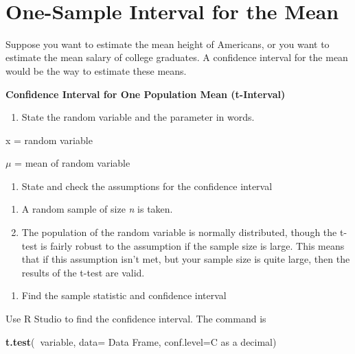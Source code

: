 \documentclass[
]{book}
\newenvironment{Shaded}{\begin{snugshade}}{\end{snugshade}}
\newcommand{\DataTypeTok}[1]{\textcolor[rgb]{0.13,0.29,0.53}{#1}}
\newcommand{\KeywordTok}[1]{\textcolor[rgb]{0.13,0.29,0.53}{\textbf{#1}}}
\newcommand{\NormalTok}[1]{#1}
\newcommand{\OperatorTok}[1]{\textcolor[rgb]{0.81,0.36,0.00}{\textbf{#1}}}
\providecommand{\tightlist}{%
  \setlength{\itemsep}{0pt}\setlength{\parskip}{0pt}}
\begin{document}
\textbf{\\
}

\hypertarget{one-sample-interval-for-the-mean}{%
\section{One-Sample Interval for the Mean}\label{one-sample-interval-for-the-mean}}

Suppose you want to estimate the mean height of Americans, or you want to estimate the mean salary of college graduates. A confidence interval for the mean would be the way to estimate these means.

\textbf{Confidence Interval for One Population Mean (t-Interval)}

\begin{enumerate}
\def\labelenumi{\arabic{enumi}.}
\tightlist
\item
  State the random variable and the parameter in words.
\end{enumerate}

x = random variable

\(\mu\) = mean of random variable

\begin{enumerate}
\def\labelenumi{\arabic{enumi}.}
\setcounter{enumi}{1}
\tightlist
\item
  State and check the assumptions for the confidence interval
\end{enumerate}

\begin{enumerate}
\def\labelenumi{\alph{enumi}.}
\item
  A random sample of size \emph{n} is taken.
\item
  The population of the random variable is normally distributed, though the t-test is fairly robust to the assumption if the sample size is large. This means that if this assumption isn't met, but your sample size is quite large, then the results of the t-test are valid.
\end{enumerate}

\begin{enumerate}
\def\labelenumi{\arabic{enumi}.}
\setcounter{enumi}{2}
\tightlist
\item
  Find the sample statistic and confidence interval
\end{enumerate}

Use R Studio to find the confidence interval. The command is

\begin{Shaded}
\begin{Highlighting}[]
\KeywordTok{t.test}\NormalTok{(}\OperatorTok{~}\NormalTok{variable, }\DataTypeTok{data=}\NormalTok{ Data Frame, }\DataTypeTok{conf.level=}\NormalTok{C as a decimal)}
\end{Highlighting}
\end{Shaded}
\end{document}
